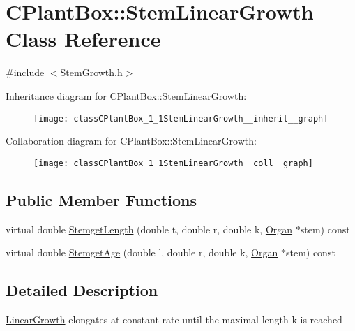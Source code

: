 \hypertarget{classCPlantBox_1_1StemLinearGrowth}{}\section{C\+Plant\+Box\+:\+:Stem\+Linear\+Growth Class Reference}
\label{classCPlantBox_1_1StemLinearGrowth}


{\ttfamily \#include $<$Stem\+Growth.\+h$>$}



Inheritance diagram for C\+Plant\+Box\+:\+:Stem\+Linear\+Growth\+:\nopagebreak
\begin{figure}[H]
\begin{center}
\leavevmode
\texttt{[image: classCPlantBox\_1\_1StemLinearGrowth\_\_inherit\_\_graph]}
\end{center}
\end{figure}


Collaboration diagram for C\+Plant\+Box\+:\+:Stem\+Linear\+Growth\+:\nopagebreak
\begin{figure}[H]
\begin{center}
\leavevmode
\texttt{[image: classCPlantBox\_1\_1StemLinearGrowth\_\_coll\_\_graph]}
\end{center}
\end{figure}
\subsection*{Public Member Functions}
\begin{DoxyCompactItemize}
\item 
virtual double \hyperlink{classCPlantBox_1_1StemLinearGrowth_a32bf6f210d011546e25892c87a1e00ba}{Stemget\+Length} (double t, double r, double k, \hyperlink{classCPlantBox_1_1Organ}{Organ} $\ast$stem) const
\item 
virtual double \hyperlink{classCPlantBox_1_1StemLinearGrowth_a439989850767e6c1d334c9152a5ff5d7}{Stemget\+Age} (double l, double r, double k, \hyperlink{classCPlantBox_1_1Organ}{Organ} $\ast$stem) const
\end{DoxyCompactItemize}


\subsection{Detailed Description}
\hyperlink{classCPlantBox_1_1LinearGrowth}{Linear\+Growth} elongates at constant rate until the maximal length k is reached 

